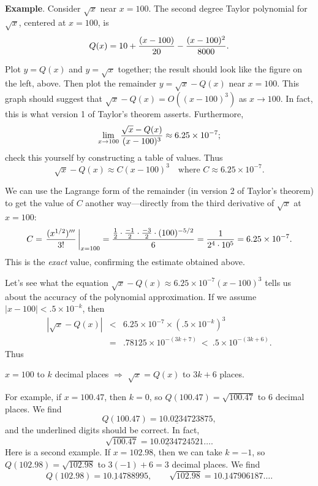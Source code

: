 {{{{\medskip



{\bf Example}.  Consider $\sqrt{x}$ near $x = 100$.  The second degree Taylor polynomial for $\sqrt{x}$, centered at $x = 100$, is
        \[
Q(x) = 10 + {(x - 100) \over 20} - {(x - 100)^2 \over 8000}.
\]

\vspace{105pt}

\noindent
Plot $y = Q(x)$ and $y = \sqrt{x}$ together; 
the result should look like the figure on the left, above.  Then plot the remainder $y = \sqrt{x} - Q(x)$ near $x = 100$.  This graph should suggest that $\sqrt{x} - Q(x) = O((x-100)^3)$ as $x \to 100$.  In fact, this is what version 1 of Taylor's theorem asserts.  Furthermore,
        \[
\lim_{x \to 100} {\sqrt{x} - Q(x) \over (x - 100)^3} 
                \approx 6.25 \times 10^{-7};
\]
check this yourself by constructing a table of values.  Thus
        \[
\sqrt{x} - Q(x) \approx C (x - 100)^3 \quad 
                \mbox{where $C \approx 6.25 \times 10^{-7}$}.
\] 

        We can use the Lagrange form of the remainder  
(in version 2 of Taylor's theorem) to get the value of $C$ another way---directly from the third derivative of $\sqrt{x}$ at $x = 100$:
        \[
C = \left. {(x^{1/2})''' \over 3!} \, \right|_{x = 100} = 
          {{1 \over 2} \cdot {-1 \over 2} \cdot {-3 \over 2} \cdot (100)^{-5/2} 
                \over 6} = 
          {1 \over 2^4 \cdot 10^5} = 6.25 \times 10^{-7}.
\]
This is the {\em exact\/} value, confirming the estimate obtained above.

        Let's see what the equation  
$\sqrt{x} - Q(x) \approx 6.25 \times 10^{-7} (x - 100)^3$ tells us about the accuracy of the polynomial approximation.  If we assume $|x - 100| < .5 \times 10^{-k}$, then
        \begin{eqnarray*}
        |\sqrt{x} - Q(x)| &<& 6.25 \times 10^{-7} \times 
                        (.5 \times 10^{-k})^3 \\
        &=& .78125 \times 10^{-(3k+7)} \ < \ .5 \times 10^{-(3k+6)}.
        \end{eqnarray*}
Thus
        \begin{center}
        $x = 100$ to $k$ decimal places 
        $\Longrightarrow$
        $\sqrt{x} = Q(x)$ to $3k + 6$ places.
        \end{center}
For example, if $x = 100.47$, then $k = 0$, so $Q(100.47) = \sqrt{100.47}$ to 6 decimal places.  We find 
        \[
Q(100.47) = \underline{10.023472}3875,
\]
and the underlined digits should be correct.  In fact, 
        \[
\sqrt{100.47} =  \underline{10.023472}4521\ldots .
\]
Here is a second example.  If $x = 102.98$, then we can take $k = -1$, so $Q(102.98) = \sqrt{102.98}$ to $3 (-1) + 6 = 3$ decimal places.  We find
        \[
Q(102.98) = \underline{10.147}88995, \qquad
                \sqrt{102.98} = \underline{10.147}906187\ldots .
\]

}}}}
